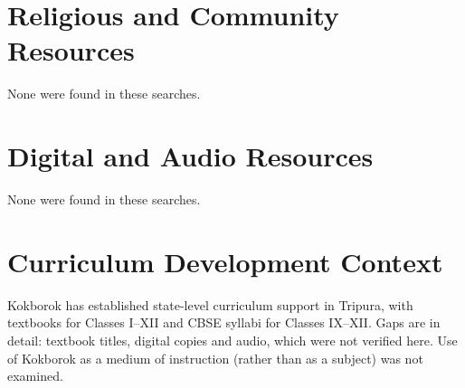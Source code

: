 \documentclass[12pt]{article}
\begin{document}
\section{Religious and Community Resources}
None were found in these searches.

\section{Digital and Audio Resources}
None were found in these searches.

\section{Curriculum Development Context}
Kokborok has established state-level curriculum support in Tripura, with textbooks for Classes I--XII and CBSE syllabi for Classes IX--XII. Gaps are in detail: textbook titles, digital copies and audio, which were not verified here. Use of Kokborok as a medium of instruction (rather than as a subject) was not examined.
\end{document}
